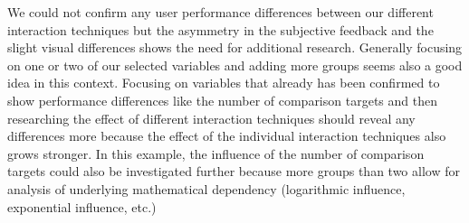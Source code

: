 We could not confirm any user performance differences between our different interaction techniques but the asymmetry in the subjective feedback and the slight visual differences
shows the need for additional research. Generally focusing on one or two of our selected variables and adding more groups seems also a good idea in this context. Focusing on
variables that already has been confirmed to show performance differences like the number of comparison targets and then researching the effect of different interaction
techniques should reveal any differences more because the effect of the individual interaction techniques also grows stronger. In this example, the influence of the number
of comparison targets could also be investigated further because more groups than two allow for analysis of underlying mathematical dependency (logarithmic influence, exponential influence, etc.)